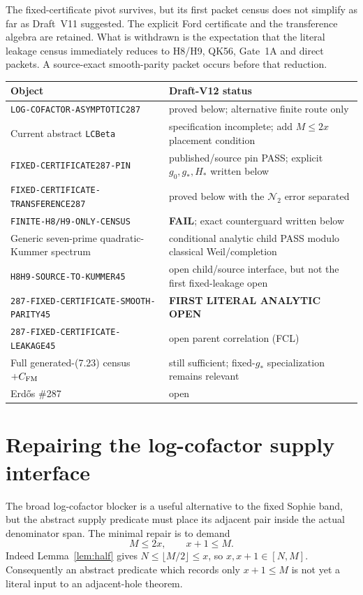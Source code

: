 \documentclass[11pt]{article}
\theoremstyle{definition}
\theoremstyle{remark}
\newcommand{\1}{\mathbf 1}
\begin{document}
The fixed-certificate pivot survives, but its first packet census does not simplify as far as Draft~V11
suggested.  The explicit Ford certificate and the transference algebra are retained.  What is withdrawn is the
expectation that the literal leakage census immediately reduces to H8/H9, QK56, Gate~1A and direct packets.
A source-exact smooth-parity packet occurs before that reduction.

\begin{center}
\begin{tabular}{p{}p{}}
\toprule
Object & Draft-V12 status\\
\midrule
\texttt{LOG-COFACTOR-ASYMPTOTIC287} & proved below; alternative finite route only\\
Current abstract \texttt{LCBeta} & specification incomplete; add $M\le2x$ placement condition\\
\texttt{FIXED-CERTIFICATE287-PIN} & published/source pin PASS; explicit $g_0,g_*,H_*$ written below\\
\texttt{FIXED-CERTIFICATE-TRANSFERENCE287} & proved below with the $\mathcal N_2$ error separated\\
\texttt{FINITE-H8/H9-ONLY-CENSUS} & \textbf{FAIL}; exact counterguard written below\\
Generic seven-prime quadratic-Kummer spectrum & conditional analytic child PASS modulo classical Weil/completion\\
\texttt{H8H9-SOURCE-TO-KUMMER45} & open child/source interface, but not the first fixed-leakage open\\
\texttt{287-FIXED-CERTIFICATE-SMOOTH-PARITY45} & \textbf{FIRST LITERAL ANALYTIC OPEN}\\
\texttt{287-FIXED-CERTIFICATE-LEAKAGE45} & open parent correlation (FCL)\\
Full generated-(7.23) census $+C_{\rm FM}$ & still sufficient; fixed-$g_*$ specialization remains relevant\\
Erd\H{o}s \#287 & open\\
\bottomrule
\end{tabular}
\end{center}

\section{Repairing the log-cofactor supply interface}\label{sec:logcof-asym}

The broad log-cofactor blocker is a useful alternative to the fixed Sophie band, but the abstract supply
predicate must place its adjacent pair inside the actual denominator span.  The minimal repair is to demand
\[
 \boxed{M\le 2x,\qquad x+1\le M.}
 \tag{LC-place}
\]
Indeed Lemma~\ref{lem:half} gives $N\le\lfloor M/2\rfloor\le x$, so $x,x+1\in[N,M]$.
Consequently an abstract predicate which records only $x+1\le M$ is not yet a literal input to an
adjacent-hole theorem.
\end{document}

